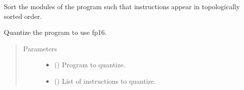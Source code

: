 \documentclass[letterpaper,10pt,english]{sphinxmanual}
\begin{document}

\begin{fulllineitems}
\label{\detokenize{reference/py:migraphx.sort}}
\sphinxAtStartPar
Sort the modules of the program such that instructions appear in topologically sorted order.

\end{fulllineitems}


\begin{fulllineitems}
\label{\detokenize{reference/py:migraphx.quantize_fp16}}
\sphinxAtStartPar
Quantize the program to use fp16.
\begin{quote}\begin{description}
\item[{Parameters}] \leavevmode\begin{itemize}
\item {} 
\sphinxAtStartPar
{} ({\hyperref[\detokenize{reference/py:migraphx.program}]{}}) \textendash{} Program to quantize.

\item {} 
\sphinxAtStartPar
{} (\sphinxstyleliteralemphasis{\sphinxupquote{{[}}}\sphinxstyleliteralemphasis{\sphinxupquote{{]}}}) \textendash{} List of instructions to quantize.

\end{itemize}

\end{description}\end{quote}

\end{fulllineitems}

\end{document}

